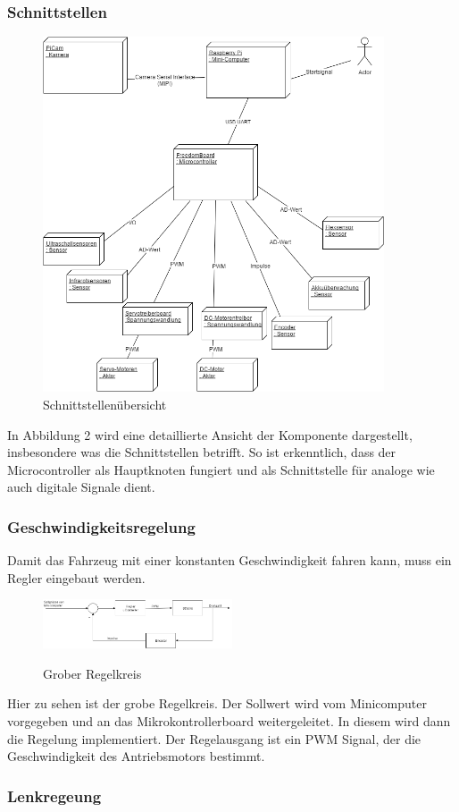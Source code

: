 \subsubsection{Schnittstellen}
\begin{figure}[h!]%
\centering
\includegraphics[width=0.9\textwidth]{03_Loesungskonzept/pictures/verteilungsdiagramm.png}
\caption{Schnittstellenübersicht}
\label{fig:Java}
\end{figure}
In Abbildung 2 wird eine detaillierte Ansicht der Komponente dargestellt, insbesondere was die Schnittstellen betrifft. So ist erkenntlich, dass der Microcontroller als Hauptknoten fungiert und als Schnittstelle für analoge wie auch digitale Signale dient.
\subsubsection{Geschwindigkeitsregelung}
Damit das Fahrzeug mit einer konstanten Geschwindigkeit fahren kann, muss ein Regler eingebaut werden.
\begin{figure}[H]
	\centering
	\includegraphics[width=0.5\textwidth]{03_Loesungskonzept/pictures/Gesch_Regelung.png}
	\label{fig:Flex_R_Kennlinie}
	\caption{Grober Regelkreis}
\end{figure}
Hier zu sehen ist der grobe Regelkreis. Der Sollwert wird vom Minicomputer vorgegeben und an das Mikrokontrollerboard weitergeleitet. In diesem wird dann die Regelung implementiert. Der Regelausgang ist ein PWM Signal, der die Geschwindigkeit des Antriebsmotors bestimmt. 
\subsubsection{Lenkregeung}